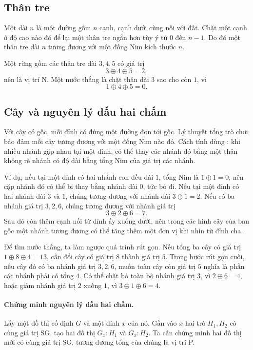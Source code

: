 \documentclass[11pt]{article}
\newcommand{\xor}{\mathbin{\oplus}}
\begin{document}
\subsection{Thân tre}

Một  dài \(n\) là một đường gồm \(n\) cạnh, cạnh dưới cùng nối
với đất. Chặt một cạnh ở độ cao nào đó để lại một thân tre ngắn hơn tùy ý từ
\(0\) đến \(n-1\). Do đó một thân tre dài \(n\) tương đương với một đống Nim
kích thước \(n\).

Một rừng gồm các thân tre dài \(3,4,5\) có giá trị
\[
  3\xor4\xor5=2,
\]
nên là vị trí N. Một nước thắng là chặt thân dài \(3\) sao cho còn \(1\), vì
\[
  1\xor4\xor5=0.
\]

\subsection{Cây và nguyên lý dấu hai chấm}

Với cây có gốc, mỗi đỉnh có đúng một đường đơn tới gốc. Lý thuyết tổng trò
chơi bảo đảm mỗi cây tương đương với một đống Nim nào đó. Cách tính dùng
: khi nhiều nhánh gặp nhau tại một đỉnh, có thể
thay các nhánh đó bằng một thân không rẽ nhánh có độ dài bằng tổng Nim của
giá trị các nhánh.

Ví dụ, nếu tại một đỉnh có hai nhánh con đều dài \(1\), tổng Nim là
\(1\xor1=0\), nên cặp nhánh đó có thể bị thay bằng nhánh dài \(0\), tức bỏ đi.
Nếu tại một đỉnh có hai nhánh dài \(3\) và \(1\), chúng tương đương với nhánh
dài \(3\xor1=2\). Nếu có ba nhánh giá trị \(3,2,6\), chúng tương đương với
nhánh giá trị
\[
  3\xor2\xor6=7.
\]
Sau đó còn thêm cạnh nối từ đỉnh ấy xuống dưới, nên trong các hình cây của bản
gốc một nhánh tương đương có thể tăng thêm một đơn vị khi nhìn từ đỉnh cha.

Để tìm nước thắng, ta làm ngược quá trình rút gọn. Nếu tổng ba cây có giá trị
\(1\xor8\xor4=13\), cần đổi cây có giá trị \(8\) thành giá trị \(5\). Trong
bước rút gọn cuối, nếu cây đó có ba nhánh giá trị \(3,2,6\), muốn toàn cây còn
giá trị \(5\) nghĩa là phần các nhánh phải có tổng \(4\). Có thể chặt bỏ toàn
bộ nhánh giá trị \(3\), vì \(2\xor6=4\), hoặc giảm nhánh giá trị \(2\) xuống
\(1\), vì \(3\xor1\xor6=4\).

\paragraph{Chứng minh nguyên lý dấu hai chấm.}
Lấy một đồ thị cố định \(G\) và một đỉnh \(x\) của nó. Gắn vào \(x\) hai trò
\(H_1,H_2\) có cùng giá trị SG, tạo hai đồ thị \(G_x:H_1\) và \(G_x:H_2\). Ta
cần chứng minh hai đồ thị mới có cùng giá trị SG, tương đương tổng của chúng
là vị trí P.
\end{document}

